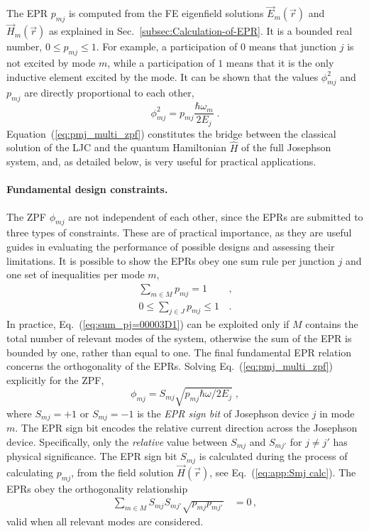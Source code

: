 The EPR $p_{mj}$ is computed from the FE eigenfield solutions $\vec{E}_{m}(\vec{r})$
and $\vec{H}_{m}(\vec{r})$ as explained in Sec.~\ref{subsec:Calculation-of-EPR}.
It is a bounded real number, $0\leq p_{mj}\leq1$. For example, a
participation of 0 means that junction $j$ is not excited by mode
$m$, while a participation of $1$ means that it is the only inductive
element excited by the mode. It can be shown that the values $\phi_{mj}^{2}$
and $p_{mj}$ are directly proportional to each other, 
\begin{equation}
\boxed{\phi_{mj}^{2}=p_{mj}\frac{\hbar\omega_{m}}{2E_{j}}\;.}\label{eq:pmj_multi_zpf}
\end{equation}
Equation~(\ref{eq:pmj_multi_zpf}) constitutes the bridge between
the classical solution of the LJC and the quantum Hamiltonian $\hat{H}$
of the full Josephson system, and, as detailed below, is very useful
for practical applications.

\paragraph{Fundamental design constraints. }

The ZPF $\phi_{mj}$ are not independent of each other, since the
EPRs are submitted to three types of constraints. These are of practical
importance, as they are useful guides in evaluating the performance
of possible designs and assessing their limitations. It is possible
to show the EPRs obey one sum rule per junction $j$ and one set of
inequalities per mode $m$, \begin{subequations} 
\begin{align}
\sum_{m\in M}p_{mj}=1 & \,,\label{eq:sum_pj=00003D1}\\
0\leq\sum_{j\in J}p_{mj}\leq1 & \,.\label{eq:sum_pj<1}
\end{align}
\end{subequations} In practice, Eq.~(\ref{eq:sum_pj=00003D1}) can
be exploited only if $M$ contains the total number of relevant modes
of the system, otherwise the sum of the EPR is bounded by one, rather
than equal to one. The final fundamental EPR relation concerns the
orthogonality of the EPRs. Solving Eq.~(\ref{eq:pmj_multi_zpf})
explicitly for the ZPF, 
\begin{equation}
\phi_{mj}=S_{mj}\sqrt{p_{mj}\hbar\omega/2E_{j}}\;,\label{eq:zpf-general-Smj-Pmj}
\end{equation}
where $S_{mj}=+1$ or $S_{mj}=-1$ is the \textit{EPR sign bit} of
Josephson device $j$ in mode $m$. The EPR sign bit encodes the relative
current direction across the Josephson device. Specifically, only
the \textit{relative} value between $S_{mj}$ and $S_{mj'}$ for $j\neq j'$
has physical significance. The EPR sign bit $S_{mj}$ is calculated
during the process of calculating $p_{mj}$, from the field solution
$\vec{H}(\vec{r})$, see Eq.~(\ref{eq:app:Smj calc}). The EPRs obey
the orthogonality relationship 
\begin{align}
\sum_{m\in M}S_{mj}S_{mj'}\sqrt{p_{mj}p_{mj'}}\, & =0\,,\label{eq:pmjpmj' orthogonality}
\end{align}
valid when all relevant modes are considered.

